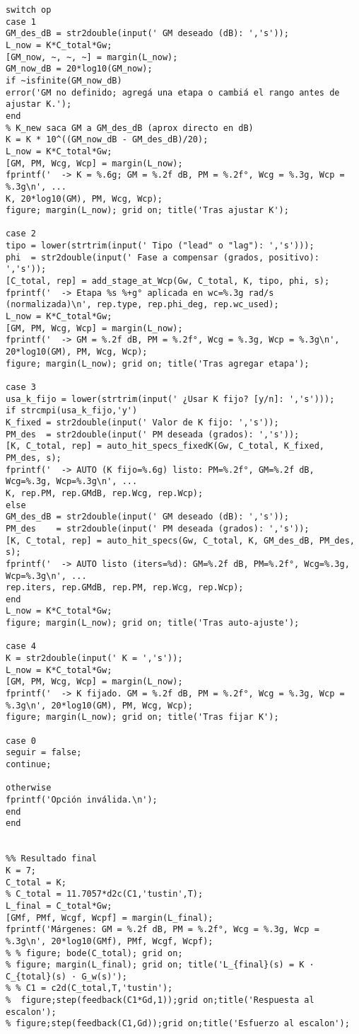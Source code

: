 \begin{lstlisting}[style=matlabstyle,caption={Hoja cálculos utilizada para el diseño de los compensadores.},label={matlab:hojaDeCalculos}]
switch op
case 1
GM_des_dB = str2double(input(' GM deseado (dB): ','s'));
L_now = K*C_total*Gw;
[GM_now, ~, ~, ~] = margin(L_now);
GM_now_dB = 20*log10(GM_now);
if ~isfinite(GM_now_dB)
error('GM no definido; agregá una etapa o cambiá el rango antes de ajustar K.');
end
% K_new saca GM a GM_des_dB (aprox directo en dB)
K = K * 10^((GM_now_dB - GM_des_dB)/20);
L_now = K*C_total*Gw;
[GM, PM, Wcg, Wcp] = margin(L_now);
fprintf('  -> K = %.6g; GM = %.2f dB, PM = %.2f°, Wcg = %.3g, Wcp = %.3g\n', ...
K, 20*log10(GM), PM, Wcg, Wcp);
figure; margin(L_now); grid on; title('Tras ajustar K');

case 2
tipo = lower(strtrim(input(' Tipo ("lead" o "lag"): ','s')));
phi  = str2double(input(' Fase a compensar (grados, positivo): ','s'));
[C_total, rep] = add_stage_at_Wcp(Gw, C_total, K, tipo, phi, s);
fprintf('  -> Etapa %s %+g° aplicada en wc=%.3g rad/s (normalizada)\n', rep.type, rep.phi_deg, rep.wc_used);
L_now = K*C_total*Gw;
[GM, PM, Wcg, Wcp] = margin(L_now);
fprintf('  -> GM = %.2f dB, PM = %.2f°, Wcg = %.3g, Wcp = %.3g\n', 20*log10(GM), PM, Wcg, Wcp);
figure; margin(L_now); grid on; title('Tras agregar etapa');

case 3
usa_k_fijo = lower(strtrim(input(' ¿Usar K fijo? [y/n]: ','s')));
if strcmpi(usa_k_fijo,'y')
K_fixed = str2double(input(' Valor de K fijo: ','s'));
PM_des  = str2double(input(' PM deseada (grados): ','s'));
[K, C_total, rep] = auto_hit_specs_fixedK(Gw, C_total, K_fixed, PM_des, s);
fprintf('  -> AUTO (K fijo=%.6g) listo: PM=%.2f°, GM=%.2f dB, Wcg=%.3g, Wcp=%.3g\n', ...
K, rep.PM, rep.GMdB, rep.Wcg, rep.Wcp);
else
GM_des_dB = str2double(input(' GM deseado (dB): ','s'));
PM_des    = str2double(input(' PM deseada (grados): ','s'));
[K, C_total, rep] = auto_hit_specs(Gw, C_total, K, GM_des_dB, PM_des, s);
fprintf('  -> AUTO listo (iters=%d): GM=%.2f dB, PM=%.2f°, Wcg=%.3g, Wcp=%.3g\n', ...
rep.iters, rep.GMdB, rep.PM, rep.Wcg, rep.Wcp);
end
L_now = K*C_total*Gw;
figure; margin(L_now); grid on; title('Tras auto-ajuste');

case 4
K = str2double(input(' K = ','s'));
L_now = K*C_total*Gw;
[GM, PM, Wcg, Wcp] = margin(L_now);
fprintf('  -> K fijado. GM = %.2f dB, PM = %.2f°, Wcg = %.3g, Wcp = %.3g\n', 20*log10(GM), PM, Wcg, Wcp);
figure; margin(L_now); grid on; title('Tras fijar K');

case 0
seguir = false;
continue;

otherwise
fprintf('Opción inválida.\n');
end
end


%% Resultado final
K = 7;
C_total = K;
% C_total = 11.7057*d2c(C1,'tustin',T);
L_final = C_total*Gw;
[GMf, PMf, Wcgf, Wcpf] = margin(L_final);
fprintf('Márgenes: GM = %.2f dB, PM = %.2f°, Wcg = %.3g, Wcp = %.3g\n', 20*log10(GMf), PMf, Wcgf, Wcpf);
% % figure; bode(C_total); grid on;
% figure; margin(L_final); grid on; title('L_{final}(s) = K · C_{total}(s) · G_w(s)');
% % C1 = c2d(C_total,T,'tustin');
%  figure;step(feedback(C1*Gd,1));grid on;title('Respuesta al escalon');
% figure;step(feedback(C1,Gd));grid on;title('Esfuerzo al escalon');




\end{lstlisting}
